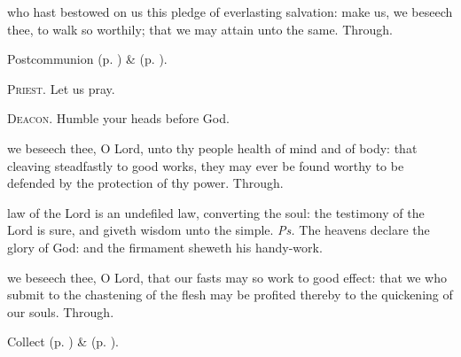 
\postcommunion
{} who hast bestowed on us this pledge of everlasting salvation: make us, we beseech thee, to walk so worthily; that we may attain unto the same. Through.
\begin{rubric}
     Postcommunion  (p. \pageref{AshWednesdayMassPostcommunion}) \&   (p. \pageref{SPLivingDeparted}).
\end{rubric}

\textsc{Priest.} Let us pray.\par
\textsc{Deacon.} Humble your heads before God.\par
{} we beseech thee, O Lord, unto thy people health of mind and of body: that cleaving steadfastly to good works, they may ever be found worthy to be defended by the protection of thy power. Through.


\clearpage
{}
\introit
{} law of the Lord is an undefiled law, converting the soul: the testimony of the Lord is sure, and giveth wisdom unto the simple. \textit{Ps.} The heavens declare the glory of God: and the firmament sheweth his handy-work.

\collect
{} we beseech thee, O Lord, that our fasts may so work to good effect: that we who submit to the chastening of the flesh may be profited thereby to the quickening of our souls. Through.
\begin{rubric}
     Collect  (p. \pageref{AshWednesdayMassCollect}) \&   (p. \pageref{SPLivingDeparted}).
\end{rubric}

